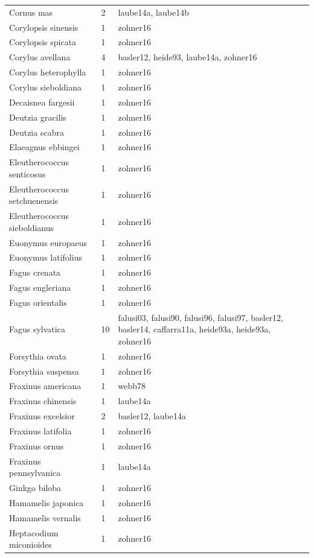 \documentclass{article}
\begin{document}
\begin{footnotesize}
\begin{longtable}{|p{}|p{}|p{}|}
  Cornus mas &   2 & laube14a, laube14b \\ 
  Corylopsis sinensis &   1 & zohner16 \\ 
  Corylopsis spicata &   1 & zohner16 \\ 
  Corylus avellana &   4 & basler12, heide93, laube14a, zohner16 \\ 
  Corylus heterophylla &   1 & zohner16 \\ 
  Corylus sieboldiana &   1 & zohner16 \\ 
  Decaisnea fargesii &   1 & zohner16 \\ 
  Deutzia gracilis &   1 & zohner16 \\ 
  Deutzia scabra &   1 & zohner16 \\ 
  Elaeagnus ebbingei &   1 & zohner16 \\ 
  Eleutherococcus senticosus &   1 & zohner16 \\ 
  Eleutherococcus setchuenensis &   1 & zohner16 \\ 
  Eleutherococcus sieboldianus &   1 & zohner16 \\ 
  Euonymus europaeus &   1 & zohner16 \\ 
  Euonymus latifolius &   1 & zohner16 \\ 
  Fagus crenata &   1 & zohner16 \\ 
  Fagus engleriana &   1 & zohner16 \\ 
  Fagus orientalis &   1 & zohner16 \\ 
  Fagus sylvatica &  10 & falusi03, falusi90, falusi96, falusi97, basler12, basler14, caffarra11a, heide93a, heide93a, zohner16 \\ 
  Forsythia ovata &   1 & zohner16 \\ 
  Forsythia suspensa &   1 & zohner16 \\ 
  Fraxinus americana &   1 & webb78 \\ 
  Fraxinus chinensis &   1 & laube14a \\ 
  Fraxinus excelsior &   2 & basler12, laube14a \\ 
  Fraxinus latifolia &   1 & zohner16 \\ 
  Fraxinus ornus &   1 & zohner16 \\ 
  Fraxinus pennsylvanica &   1 & laube14a \\ 
  Ginkgo biloba &   1 & zohner16 \\ 
  Hamamelis japonica &   1 & zohner16 \\ 
  Hamamelis vernalis &   1 & zohner16 \\ 
  Heptacodium miconioides &   1 & zohner16 \\ 

\end{longtable}
\end{footnotesize}
\end{document}
